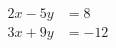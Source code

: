 \documentclass[12pt, letter, oneside]{book}
\begin{document}
\begin{align*} 
2x - 5y &=  8 \\ 
3x + 9y &=  -12
\end{align*}
\end{document}
